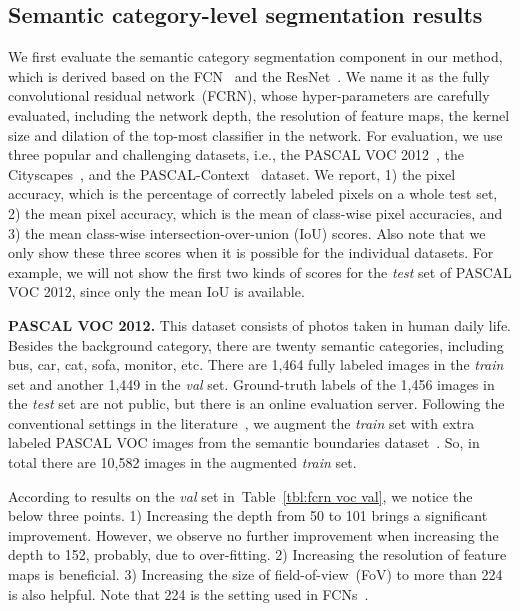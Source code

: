 \documentclass{article}
\begin{document}
\subsection{Semantic category-level segmentation results}
We first evaluate the semantic category segmentation component in our method,
which is derived based on the FCN~\cite{FCN.CVPR.2015.Long} and the ResNet~\cite{ResNet.CVPR.2016.He}.
We name it as the fully convolutional residual network~(FCRN), whose hyper-parameters are carefully evaluated, including the network depth, the resolution of feature maps, the kernel size and dilation of the top-most classifier in the network.
For evaluation, we use three popular and challenging datasets,
i.e., the PASCAL VOC 2012~\cite{PascalVoc.IJCV.2014.Everingham}, the Cityscapes~\cite{Cityscapes.CVPR.2016.Cordts}, and the \mbox{PASCAL-Context}~\cite{PascalContext.CVPR.2014.Mottaghi} dataset.
We report,
1) the pixel accuracy, which is the percentage of correctly labeled pixels on a whole test set,
2) the mean pixel accuracy, which is the mean of class-wise pixel accuracies, and
3) the mean class-wise intersection-over-union (IoU) scores.
Also note that we only show these three scores when it is possible for the individual datasets.
For example, we will not show the first two kinds of scores for the \emph{test} set of PASCAL VOC 2012, since only the mean IoU is available.


\textbf{PASCAL VOC 2012.}
This dataset consists of photos taken in human daily life.
Besides the background category, there are twenty semantic categories, including bus, car, cat, sofa, monitor, etc.
There are 1,464 fully labeled images in the \emph{train} set and another 1,449 in the \emph{val} set.
Ground-truth labels of the 1,456 images in the \emph{test} set are not public, but there is an online evaluation server.
Following the conventional settings in the literature~\cite{FCN.CVPR.2015.Long,DeepLab.ICLR.2015.Chen}, we augment the \emph{train} set with extra labeled PASCAL VOC images from the semantic boundaries dataset~\cite{SBD.ICCV.2011.Hariharan}.
So, in total there are 10,582 images in the augmented \emph{train} set.

According to results on the \emph{val} set in~Table~\ref{tbl:fcrn voc val},
we notice the below three points.
1) Increasing the depth from 50 to 101 brings a significant improvement.
However, we observe no further improvement when increasing the depth to 152, probably, due to over-fitting.
2) Increasing the resolution of feature maps is beneficial.
3) Increasing the size of field-of-view~(FoV) to more than 224 is also helpful.
Note that 224 is the setting used in FCNs~\cite{FCN.CVPR.2015.Long}.
\end{document}
